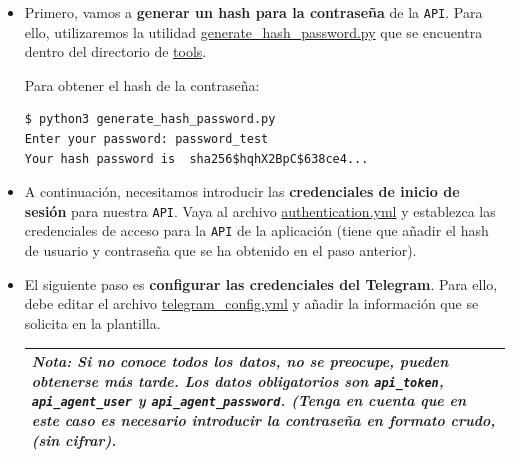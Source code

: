 \begin{itemize}

\item Primero, vamos a \textbf{generar un hash para la contraseña} de la \texttt{API}. Para ello, utilizaremos la utilidad \href{https://github.com/jmv74211/TFM_security_system_PI/blob/master/src/tools/generate_hash_password.py}{generate\_hash\_password.py} que se encuentra dentro del directorio de \href{https://github.com/jmv74211/TFM_security_system_PI/tree/master/src/tools}{tools}.

Para obtener el hash de la contraseña:

\vspace{-0.5cm}

\begin{verbatim}
$ python3 generate_hash_password.py 
Enter your password: password_test
Your hash password is  sha256$hqhX2BpC$638ce4...

\end{verbatim}

\vspace{-0.5cm}

\item A continuación, necesitamos introducir las \textbf{credenciales de inicio de sesión} para nuestra \texttt{API}. Vaya al archivo \href{https://github.com/jmv74211/TFM_security_system_PI/blob/master/src/config/authentication.yml}{authentication.yml} y establezca las credenciales de acceso para la \texttt{API} de la aplicación (tiene que añadir el hash de usuario y contraseña que se ha obtenido en el paso anterior).

\item El siguiente paso es \textbf{configurar las credenciales del Telegram}. Para ello, debe editar el archivo \href{https://github.com/jmv74211/TFM\_security\_system\_PI/blob/master/src/config/telegram\_config.yml}{telegram\_config.yml} y añadir la información que se solicita en la plantilla.

\begin{tabular}{|p{15.5cm}|}
	
	\hline
	
	\textit{\textbf{Nota}: Si no conoce todos los datos, no se preocupe, pueden obtenerse más tarde. Los datos obligatorios son \texttt{api\_token}, \texttt{api\_agent\_user} y \texttt{api\_agent\_password}. (Tenga en cuenta que en este caso es necesario introducir la contraseña en formato crudo, (sin cifrar).}
	\\
	\hline
	

\end{tabular}
\end{itemize}
